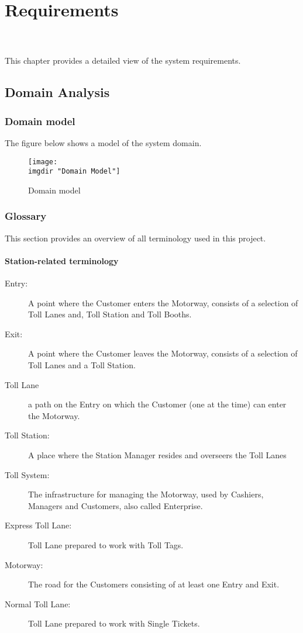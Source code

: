 \chapter{Requirements}
\martin \pawel \\\\
\noindent
This chapter provides a detailed view of the system requirements.

\section{Domain Analysis}

\subsection{Domain model}
The figure below shows a model of the system domain.
\begin{figure}[H]
\texttt{[image: \\imgdir "Domain Model"]}
\caption{Domain model}
\label{fig:domain_model}
\end{figure}

\subsection{Glossary}
This section provides an overview of all terminology used in this project.
\subsubsection{Station-related terminology}
\begin{description}
  \item[Entry:] A point where the Customer enters the Motorway, consists of a selection of Toll Lanes and, Toll Station and Toll Booths.
  \item[Exit:] A point where the Customer leaves the Motorway, consists of a selection of Toll Lanes and a Toll Station.
    \item[Toll Lane] a path on the Entry on which the Customer (one at the time) can enter the Motorway.
  \item[Toll Station:] A place where the Station Manager resides and overseers the Toll Lanes
  \item[Toll System:] The infrastructure for managing the Motorway, used by Cashiers, Managers and Customers, also called Enterprise.
  \item[Express Toll Lane:] Toll Lane prepared to work with Toll Tags.
  \item[Motorway:] The road for the Customers consisting of at least one Entry and Exit.
  \item[Normal Toll Lane:] Toll Lane prepared to work with Single Tickets.

\end{description}
